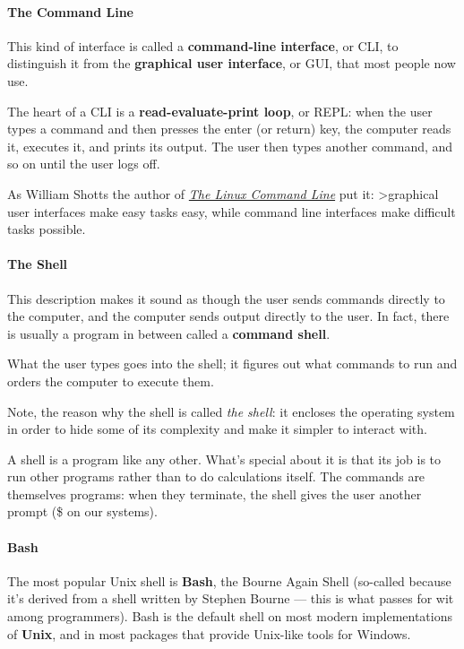 \documentclass[
]{book}
\begin{document}
\hypertarget{the-command-line}{%
\paragraph{The Command Line}\label{the-command-line}}

This kind of interface is called a \textbf{command-line interface}, or CLI,
to distinguish it from the \textbf{graphical user interface}, or GUI, that most people now use.

The heart of a CLI is a \textbf{read-evaluate-print loop}, or REPL: when the user types a command and then presses the enter (or return) key, the computer reads it, executes it, and prints its output. The user then types another command,
and so on until the user logs off.

As William Shotts the author of \emph{\href{http://linuxcommand.org/tlcl.php}{The Linux Command Line}} put it:
\textgreater graphical user interfaces make easy tasks easy, while command line interfaces make difficult tasks possible.

\hypertarget{the-shell}{%
\paragraph{The Shell}\label{the-shell}}

This description makes it sound as though the user sends commands directly to the computer, and the computer sends output directly to the user. In fact,
there is usually a program in between called a \textbf{command shell}.

What the user types goes into the shell; it figures out what commands to run and orders the computer to execute them.

Note, the reason why the shell is called \emph{the shell}: it encloses the operating system in order to hide some of its complexity and make it simpler to interact with.

A shell is a program like any other. What's special about it is that its job is to run other programs rather than to do calculations itself. The commands are themselves programs: when they terminate, the shell gives the user another prompt (\$ on our systems).

\hypertarget{bash}{%
\paragraph{Bash}\label{bash}}

The most popular Unix shell is \textbf{Bash}, the Bourne Again Shell (so-called because it's derived from a shell written by Stephen Bourne --- this is what passes for wit among programmers). Bash is the default shell on most modern implementations of \textbf{Unix}, and in most packages that provide Unix-like tools for Windows.
\end{document}

